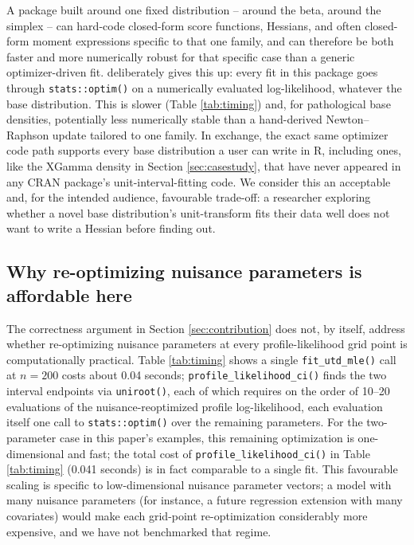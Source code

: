 A package built around one fixed distribution --  around
the beta,  around the simplex -- can hard-code
closed-form score functions, Hessians, and often closed-form moment
expressions specific to that one family, and can therefore be both
faster and more numerically robust for that specific case than a
generic optimizer-driven fit.  deliberately
gives this up: every fit in this package goes through
\texttt{stats::optim()} on a numerically evaluated log-likelihood,
whatever the base distribution. This is slower (Table
\ref{tab:timing}) and, for pathological base densities, potentially
less numerically stable than a hand-derived Newton--Raphson update
tailored to one family. In exchange, the exact same optimizer code path
supports every base distribution a user can write in R, including ones,
like the XGamma density in Section \ref{sec:casestudy}, that have never
appeared in any CRAN package's unit-interval-fitting code. We consider
this an acceptable and, for the intended audience, favourable trade-off:
a researcher exploring whether a novel base distribution's
unit-transform fits their data well does not want to write a Hessian
before finding out.

\subsection{Why re-optimizing nuisance parameters is affordable here}

The correctness argument in Section \ref{sec:contribution} does not, by
itself, address whether re-optimizing nuisance parameters at every
profile-likelihood grid point is computationally practical. Table
\ref{tab:timing} shows a single \texttt{fit\_utd\_mle()} call at $n=200$
costs about 0.04 seconds; \texttt{profile\_likelihood\_ci()} finds the
two interval endpoints via \texttt{uniroot()}, each of which requires
on the order of 10--20 evaluations of the nuisance-reoptimized profile
log-likelihood, each evaluation itself one call to
\texttt{stats::optim()} over the remaining parameters. For the
two-parameter case in this paper's examples, this remaining
optimization is one-dimensional and fast; the total cost of
\texttt{profile\_likelihood\_ci()} in Table \ref{tab:timing} (0.041
seconds) is in fact comparable to a single fit. This favourable scaling
is specific to low-dimensional nuisance parameter vectors; a model with
many nuisance parameters (for instance, a future regression extension
with many covariates) would make each grid-point re-optimization
considerably more expensive, and we have not benchmarked that regime.

